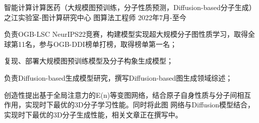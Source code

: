 \begin{cventries}
  \cventry
  {智能计算计算医药（大规模图预训练，分子性质预测，Diffusion-based分子生成）} %
  {之江实验室-图计算研究中心} %
  {图算法工程师} %
  {2022年7月-至今} %
  {
    \begin{cvitems} %
      \item {负责OGB-LSC NeurIPS22竞赛，构建模型实现超大规模分子图性质学习，取得全球第11名，参与OGB-DDI榜单打榜，取得榜单第一名；}
      \item {复现、部署大规模图预训练模型及分子构象生成模型；}
      \item {负责Diffusion-based生成模型研究，撰写Diffusion-based图生成领域综述；}
      \item {创造性提出基于全局注意力的E(n)等变图网络，结合原子自身性质与分子间相互作用，实现时下最优的3D分子学习性能。同时将此图
      网络与Diffusion模型结合，实现时下最优的3D分子生成性能，相关文章正在撰写中。}
    \end{cvitems}
  }
\end{cventries}